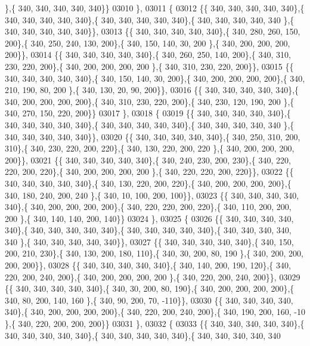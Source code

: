 \begin{DoxyCode}
      \},\{ 340, 340, 340, 340, 340\}\}
03010 \},
03011 \{
03012 \{\{ 340, 340, 340, 340, 340\},\{ 340, 340, 340, 340, 340\},\{ 340, 340, 340, 340, 340\},\{ 340, 340, 340, 340, 340
      \},\{ 340, 340, 340, 340, 340\}\},
03013 \{\{ 340, 340, 340, 340, 340\},\{ 340, 280, 260, 150, 200\},\{ 340, 250, 240, 130, 200\},\{ 340, 150, 140,  30, 200
      \},\{ 340, 200, 200, 200, 200\}\},
03014 \{\{ 340, 340, 340, 340, 340\},\{ 340, 260, 250, 140, 200\},\{ 340, 310, 230, 220, 200\},\{ 340, 200, 200, 200, 200
      \},\{ 340, 310, 230, 220, 200\}\},
03015 \{\{ 340, 340, 340, 340, 340\},\{ 340, 150, 140,  30, 200\},\{ 340, 200, 200, 200, 200\},\{ 340, 210, 190,  80, 200
      \},\{ 340, 130,  20,  90, 200\}\},
03016 \{\{ 340, 340, 340, 340, 340\},\{ 340, 200, 200, 200, 200\},\{ 340, 310, 230, 220, 200\},\{ 340, 230, 120, 190, 200
      \},\{ 340, 270, 150, 220, 200\}\}
03017 \},
03018 \{
03019 \{\{ 340, 340, 340, 340, 340\},\{ 340, 340, 340, 340, 340\},\{ 340, 340, 340, 340, 340\},\{ 340, 340, 340, 340, 340
      \},\{ 340, 340, 340, 340, 340\}\},
03020 \{\{ 340, 340, 340, 340, 340\},\{ 340, 250, 310, 200, 310\},\{ 340, 230, 220, 200, 220\},\{ 340, 130, 220, 200, 220
      \},\{ 340, 200, 200, 200, 200\}\},
03021 \{\{ 340, 340, 340, 340, 340\},\{ 340, 240, 230, 200, 230\},\{ 340, 220, 220, 200, 220\},\{ 340, 200, 200, 200, 200
      \},\{ 340, 220, 220, 200, 220\}\},
03022 \{\{ 340, 340, 340, 340, 340\},\{ 340, 130, 220, 200, 220\},\{ 340, 200, 200, 200, 200\},\{ 340, 180, 240, 200, 240
      \},\{ 340,  10, 100, 200, 100\}\},
03023 \{\{ 340, 340, 340, 340, 340\},\{ 340, 200, 200, 200, 200\},\{ 340, 220, 220, 200, 220\},\{ 340, 110, 200, 200, 200
      \},\{ 340, 140, 140, 200, 140\}\}
03024 \},
03025 \{
03026 \{\{ 340, 340, 340, 340, 340\},\{ 340, 340, 340, 340, 340\},\{ 340, 340, 340, 340, 340\},\{ 340, 340, 340, 340, 340
      \},\{ 340, 340, 340, 340, 340\}\},
03027 \{\{ 340, 340, 340, 340, 340\},\{ 340, 150, 200, 210, 230\},\{ 340, 130, 200, 180, 110\},\{ 340,  30, 200,  80, 190
      \},\{ 340, 200, 200, 200, 200\}\},
03028 \{\{ 340, 340, 340, 340, 340\},\{ 340, 140, 200, 190, 120\},\{ 340, 220, 200, 240, 200\},\{ 340, 200, 200, 200, 200
      \},\{ 340, 220, 200, 240, 200\}\},
03029 \{\{ 340, 340, 340, 340, 340\},\{ 340,  30, 200,  80, 190\},\{ 340, 200, 200, 200, 200\},\{ 340,  80, 200, 140, 160
      \},\{ 340,  90, 200,  70, -110\}\},
03030 \{\{ 340, 340, 340, 340, 340\},\{ 340, 200, 200, 200, 200\},\{ 340, 220, 200, 240, 200\},\{ 340, 190, 200, 160, -10
      \},\{ 340, 220, 200, 200, 200\}\}
03031 \},
03032 \{
03033 \{\{ 340, 340, 340, 340, 340\},\{ 340, 340, 340, 340, 340\},\{ 340, 340, 340, 340, 340\},\{ 340, 340, 340, 340, 340

\end{DoxyCode}
